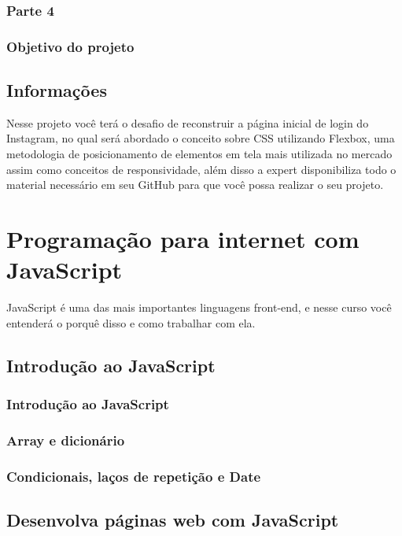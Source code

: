\documentclass[12pt,a4paper]{article}
\begin{document}
	\subsubsection{Parte 4}
	
	\subsubsection{Objetivo do projeto}
	
	
	\subsection{Informações}
	
	Nesse projeto você terá o desafio de reconstruir a página inicial de login do Instagram, no qual será abordado o conceito sobre CSS utilizando Flexbox, uma metodologia de posicionamento de elementos em tela mais utilizada no mercado assim como conceitos de responsividade, além disso a expert disponibiliza todo o material necessário em seu GitHub para que você possa realizar o seu projeto.
	
	\section{Programação para internet com JavaScript}
	
	JavaScript é uma das mais importantes linguagens front-end, e nesse curso você entenderá o porquê disso e como trabalhar com ela.
	
	\subsection{Introdução ao JavaScript}
	\subsubsection{Introdução ao JavaScript}
	
	\subsubsection{Array e dicionário}
	
	\subsubsection{Condicionais, laços de repetição e Date}
	
	
	\subsection{Desenvolva páginas web com JavaScript}
\end{document}
